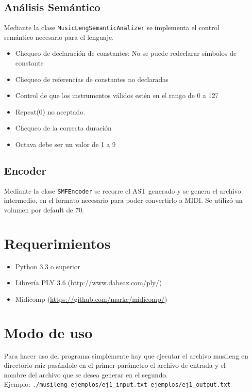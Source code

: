 \documentclass[a4paper,8pt]{article}
\begin{document}
\subsection{Análisis Semántico}
Mediante la clase \texttt{MusicLengSemanticAnalizer} se implementa el control semántico necesario para el lenguaje.
	\begin{itemize}
  		\item Chequeo de declaración de constantes: No se puede redeclarar símbolos de constante
  		\item Chequeo de referencias de constantes no declaradas
  		\item Control de que los instrumentos válidos estén en el rango de 0 a 127
  		\item Repeat(0) no aceptado.
  		\item Chequeo de la correcta duración
  		\item Octava debe ser un valor de 1 a 9
	\end{itemize}

\subsection{Encoder}
Mediante la clase \texttt{SMFEncoder} se recorre el AST generado y se genera el archivo intermedio, en el formato necesario para poder convertirlo a MIDI. Se utilizó un volumen por default de 70. 


\section{Requerimientos}
	\begin{itemize}
  		\item Python 3.3 o superior
  		\item Librería PLY 3.6 (\url{http://www.dabeaz.com/ply/})
  		\item Midicomp (\url{https://github.com/markc/midicomp/})
	\end{itemize}

\section{Modo de uso}
Para hacer uso del programa simplemente hay que ejecutar el archivo musileng en directorio raiz pasándole en el primer parámetro el archivo de entrada y el nombre del archivo que se desea generar en el segundo. \\
Ejemplo: \texttt{./musileng ejemplos/ej1\_input.txt ejemplos/ej1\_output.txt }
\end{document}

